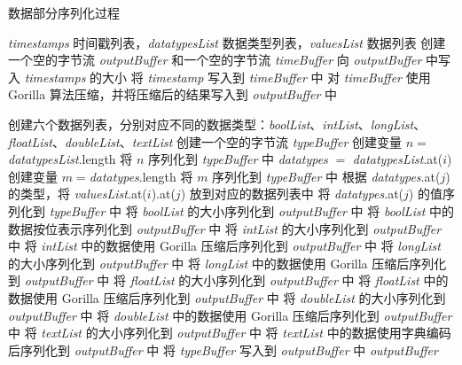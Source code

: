 \begin{algorithm}
  \caption{数据部分序列化过程}
  \label{alg:value-encoding}
  \small
  \begin{algorithmic}
    \REQUIRE \emph{timestamps} 时间戳列表，\emph{datatypesList} 数据类型列表，\emph{valuesList} 数据列表 
    \STATE 创建一个空的字节流 \emph{outputBuffer} 和一个空的字节流 \emph{timeBuffer}
    \STATE 向 \emph{outputBuffer} 中写入 \emph{timestamps} 的大小
      \STATE 将 \emph{timestamp} 写入到 \emph{timeBuffer} 中
    \ENDFOR
    \STATE 对 \emph{timeBuffer} 使用 Gorilla 算法压缩，并将压缩后的结果写入到 \emph{outputBuffer} 中 

    \STATE 创建六个数据列表，分别对应不同的数据类型：\emph{boolList}、\emph{intList}、\emph{longList}、\emph{floatList}、\emph{doubleList}、\emph{textList}
    \STATE 创建一个空的字节流 \emph{typeBuffer}
    \STATE 创建变量 $n = $\emph{datatypesList}.length
    \STATE 将 $n$ 序列化到 \emph{typeBuffer} 中
      \STATE \emph{datatypes} $=$ \emph{datatypesList}.at($i$)
      \STATE 创建变量 $m = $\emph{datatypes}.length
      \STATE 将 $m$ 序列化到 \emph{typeBuffer} 中
        \STATE 根据 \emph{datatypes}.at($j$) 的类型，将 \emph{valuesList}.at($i$).at($j$) 放到对应的数据列表中
        \STATE 将 \emph{datatypes}.at($j$) 的值序列化到 \emph{typeBuffer} 中
      \ENDFOR
    \ENDFOR
    \STATE 将 \emph{boolList} 的大小序列化到 \emph{outputBuffer} 中
    \STATE 将 \emph{boolList} 中的数据按位表示序列化到 \emph{outputBuffer} 中
    \STATE 将 \emph{intList} 的大小序列化到 \emph{outputBuffer} 中
    \STATE 将 \emph{intList} 中的数据使用 Gorilla 压缩后序列化到 \emph{outputBuffer} 中
    \STATE 将 \emph{longList} 的大小序列化到 \emph{outputBuffer} 中
    \STATE 将 \emph{longList} 中的数据使用 Gorilla 压缩后序列化到 \emph{outputBuffer} 中
    \STATE 将 \emph{floatList} 的大小序列化到 \emph{outputBuffer} 中
    \STATE 将 \emph{floatList} 中的数据使用 Gorilla 压缩后序列化到 \emph{outputBuffer} 中
    \STATE 将 \emph{doubleList} 的大小序列化到 \emph{outputBuffer} 中
    \STATE 将 \emph{doubleList} 中的数据使用 Gorilla 压缩后序列化到 \emph{outputBuffer} 中
    \STATE 将 \emph{textList} 的大小序列化到 \emph{outputBuffer} 中
    \STATE 将 \emph{textList} 中的数据使用字典编码后序列化到 \emph{outputBuffer} 中
    \STATE 将 \emph{typeBuffer} 写入到 \emph{outputBuffer} 中
    \RETURN \emph{outputBuffer}

  \end{algorithmic}
\end{algorithm}

